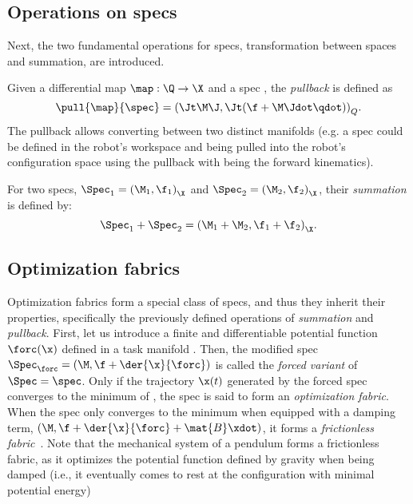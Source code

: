 \subsection{Operations on specs}%
\label{sub:operations_on_specs}
Next, the two fundamental operations for specs, transformation between spaces and
summation, are introduced.

Given a differential map $\map: \Q\rightarrow\X$ and a spec \spec{}, the \textit{pullback}
is defined as 
\begin{equation}
  \pull{\map}{\spec} = {\left(\Jt\M\J, \Jt(\f+\M\Jdot\qdot)\right)}_{Q}.
\end{equation}
The pullback allows converting between two distinct manifolds (e.g. a spec could be 
defined in the robot's workspace and being pulled into the robot's configuration space using
the pullback with \map{} being the forward kinematics).

For two specs, $\Spec_1 = {\left(\M_1,\f_1\right)}_{\X}$ and 
$\Spec_2 = {\left(\M_2,\f_2\right)}_{\X}$, their \textit{summation} is defined by:
\begin{equation}
  \Spec_1 + \Spec_2 = {\left(\M_1 + \M_2, \f_1 + \f_2\right)}_{\X}.
\end{equation}

\subsection{Optimization fabrics}%
\label{sub:optimization_fabrics}

Optimization fabrics form a special class of specs, and thus they inherit their properties,
specifically the previously defined operations of \textit{summation} and \textit{pullback}.
First, let us introduce a finite and differentiable potential
function $\forc(\x)$ defined in a task manifold \X{}. 
Then, the modified spec $\Spec_{\forc} = \left(\M,\f + \der{\x}{\forc}\right)$
is called the \textit{forced variant} of $\Spec = \spec$.
Only if the trajectory $\x(t)$ generated by the forced spec converges to the minimum of \forc{}, 
the spec is said to form an \textit{optimization fabric}.
When the spec only converges to the minimum when equipped with a damping term,
$\left(\M,\f + \der{\x}{\forc} + \mat{B}\xdot\right)$, 
it forms a \textit{frictionless fabric}~\cite[Definition 4.4]{Ratliff2020}. 
Note that the mechanical system of a pendulum forms a frictionless fabric, as it optimizes
the potential function defined by gravity when being damped (i.e., it eventually comes to
rest at the configuration with minimal potential energy)

